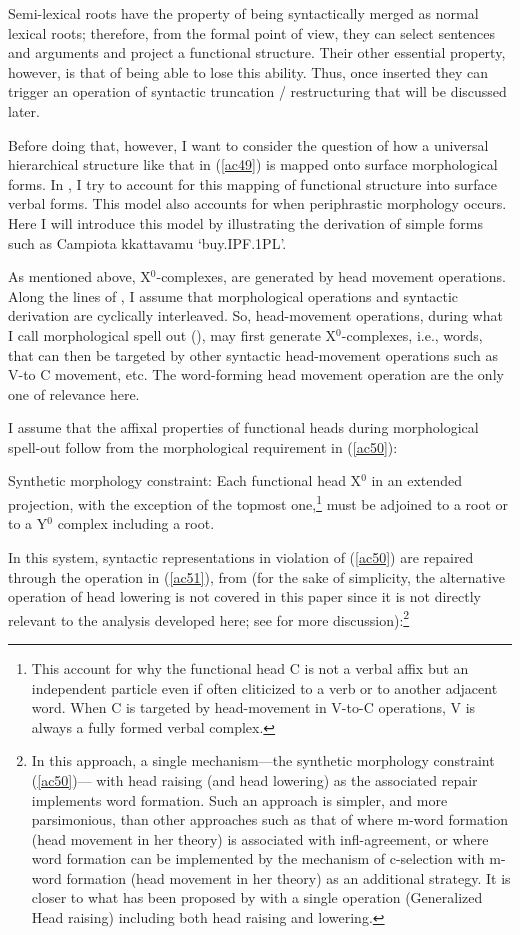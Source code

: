 \documentclass[output=paper]{langscibook}
\begin{document}
Semi-lexical roots have the property of being syntactically merged as normal lexical roots; therefore, from the formal point of view, they can select sentences and arguments and project a functional structure.  Their other essential property, however, is that of being able to lose this ability. Thus, once inserted they can trigger an operation of syntactic truncation / restructuring that will be discussed later. 

Before doing that, however, I want to consider  the question of how a universal hierarchical structure like that in (\ref{ac49}) is mapped onto surface morphological forms. In \cite{calabrese2019a}, I try to account for this mapping of functional structure into surface verbal forms. This model also accounts for when periphrastic morphology occurs. Here I will introduce this model by illustrating the derivation of simple forms such as Campiota kkattavamu ‘buy.IPF.1PL’.

As mentioned above, X$^0$-complexes, are generated by head movement operations. Along the lines of \cite{calabrese2014a}, I assume that morphological operations and syntactic derivation are cyclically interleaved. So, head-movement operations, during what I call morphological spell out (\cite{calabrese2019a}), may first generate X$^0$-complexes, i.e., words, that can then be targeted by other syntactic head-movement operations such as V-to C movement, etc. The word-forming head movement operation are the only one of relevance here.  

I assume that the affixal properties of functional heads during morphological spell-out follow from the morphological requirement in (\ref{ac50}):

\ea \label{ac50}Synthetic morphology constraint:       
Each functional head X$^0$ in an extended projection, with the exception of the topmost one,\footnote{This account for why the functional head C is not a verbal affix but an independent particle even if often cliticized to a verb or to another adjacent word.  When C is targeted by head-movement in V-to-C operations, V is always a fully formed verbal complex.} must be adjoined to a root or to a Y$^0$ complex including a root.
\z

In this system, syntactic representations in violation of (\ref{ac50}) are repaired through the operation in (\ref{ac51}), from \cite{harizanov2019a} (for the sake of simplicity, the alternative operation of head lowering is not covered in this paper since it is not directly relevant to the analysis developed here; see \cite{calabrese2019a} for more discussion):\footnote{In this approach, a single mechanism—the synthetic morphology constraint (\ref{ac50})— with head raising (and head lowering) as the associated repair implements word formation. Such an approach is simpler, and more parsimonious, than other approaches such as that of \cite{bjorkman2011a} where m-word formation (head movement in her theory) is associated with infl-agreement, or \cite{pietraszko2017a} where word formation can be implemented by the mechanism of c-selection with m-word formation (head movement in her theory) as an additional strategy. It is closer to what has been proposed by \cite{arregi2018a} with a single operation (Generalized Head raising) including both head raising and lowering.}
\end{document}
